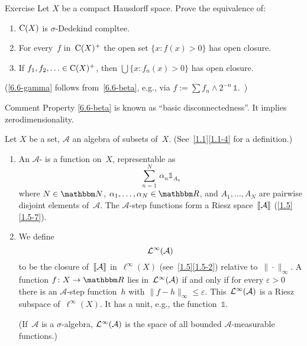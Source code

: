 \documentclass[main.tex]{subfiles}
\begin{document}
\begin{psec}{6.6}{Exercise}
Let $X$ be a compact Hausdorff space.
Prove the equivalence of:
\begin{enumerate}[label=(\greek{*})]
\item\label{6.6-alpha}
$\mathrm{C}(X)$ is $\sigma$-Dedekind compltee.
%
\item\label{6.6-beta}
For every~$f$ in~$\mathrm{C}(X)^+$ the open set $\{x\colon f(x)>0\}$
has open closure.
%
\item\label{6.6-gamma}
If $f_1,f_2,\dotsc\in\mathrm{C}(X)^+$,
then $\bigcup\bigl\{x\colon f_n(x)>0\bigr\}$ has open closure.
\end{enumerate}

(\ref{6.6-gamma} follows from~\ref{6.6-beta},
e.g., via $f:=\sum f_n\wedge 2^{-n} \, \mathbb{1}$.\ )
\end{psec}
\begin{psec*}{Comment}
Property \ref{6.6-beta} 
is known as ``basic disconnectedness''.
It implies zerodimensionality.
\end{psec*}
%
%
\begin{psec}{6.7}%
Let $X$ be a set, $\mathcal A$ an algebra of subsets of~$X$.
(See~\ref{1.1}\ref{1.1-4} for a definition.)
\begin{enumerate}
\item\label{6.7-1}
An $\mathcal A$-
is a function on~$X$,
representable as
\begin{equation*}
\sum_{n=1}^N \,\alpha_n \mathbb{1}_{A_n}
\end{equation*}
where $N\in\N$, $\alpha_1,\dotsc,\alpha_N\in\R$,
and $A_1,\dotsc,A_N$
are pairwise disjoint elements of~$\mathcal A$.
The $\mathcal A$-step functions form a Riesz space~$\lbb \mathcal A \rbb$
(\ref{1.5}\ref{1.5-7}).
%
\item\label{6.7-2}
We define
\begin{equation*}
\mathcal{L}^\infty(\mathcal{A})
\end{equation*}
to be the closure of~$\lbb\mathcal A\rbb$ in~$\ell^\infty(X)$
(see~\ref{1.5}\ref{1.5-2}) relative to~$\|\cdot\|_\infty$.
A function $f\colon X\ra\R$ lies in~$\mathcal{L}^\infty(\mathcal A)$
if and only if for every $\varepsilon>0$
there is an $\mathcal A$-step function~$h$
with $\|f-h\|_\infty\leq\varepsilon$.
This~$\mathcal{L}^\infty(\mathcal A)$ is a Riesz subspace of~$\ell^\infty(X)$.
It has a unit, e.g., the function~$\mathbb{1}$.

(If~$\mathcal A$ is a $\sigma$-algebra,
$\mathcal{L}^\infty(\mathcal A)$ is the space of
all bounded $\mathcal A$-measurable functions.)
\end{enumerate}
\end{psec}
\end{document}
